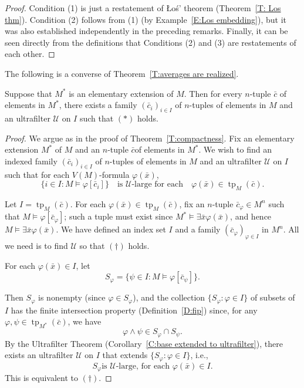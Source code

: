 \documentclass{scrartcl}
\DeclareMathOperator{\tp}{tp}
\renewcommand{\phi}{\varphi}
\newcommand{\SU}{\mathscr{U}}
\begin{document}
\begin{proof}
Condition (1) is just a restatement of Łoś' theorem (Theorem~\ref{T: Los thm}). Condition (2) follows from (1)  (by Example~\ref{E:Los embedding}), but it was also established independently in the preceding remarks.
Finally, it can be seen directly from the definitions that Conditions (2) and (3) are restatements of each other.
\end{proof}

The following is a converse of Theorem~\ref{T:averages are realized}.

\begin{theorem}
\label{T:elements are averages}
Suppose that $M^*$ is an elementary extension of $M$. Then for every $n$-tuple $\bar{c}$ of elements in $M^*$, there exists a family $(\bar{c}_i)_{i\in I}$ of $n$-tuples of elements in $M$ and an ultrafilter $\SU$ on $I$ such that $(*)$ holds.

\end{theorem}

\begin{proof}
We argue as in the proof of Theorem~\ref{T:compactness}. Fix an elementary extension $M^*$ of $M$ and an $n$-tuple $\bar c$of elements in $M^*$. We wish to find an indexed family $(\bar{c}_i)_{i\in I}$ of $n$-tuples of elements in $M$ and an ultrafilter $\mathscr{U}$ on $I$ such that for each $V(M)$-formula $\phi(\bar{x})$,
\[
\tag{$\dagger$}
\{i\in I\colon M\models \phi[\bar{c}_i]\}
\quad\text{is $\SU$-large for each}\quad
\phi(\bar{x}) \in \tp_{M}(\bar{c}).
\]

Let $I=\tp_{M}(\bar{c})$. For each $\phi(\bar x)\in \tp_{M}(\bar{c})$, fix an $n$-tuple $\bar{c}_\phi\in M^n$ such that $M\models\phi[\bar{c}_\phi]$; such a tuple must exist since $M^*\models \exists \bar{x} \phi(\bar x)$, and hence $M\models \exists \bar{x} \phi(\bar x)$. We have defined an index set $I$ and a family $(\bar{c}_\phi)_{\phi\in I}$ in $M^n$. All we need is to find $\SU$ so that $(\dagger)$ holds.

For each $\phi(\bar{x})\in I$, let
\[
S_\phi = 
\{ \psi\in I \colon M\models\phi[\bar{c}_\psi] \}.
\]

Then $S_\phi$ is nonempty (since $\phi \in S_\phi$), and
the collection $\{S_\phi \colon \phi \in I\}$ of subsets of $I$ has the finite intersection property (Definition~\ref{D:fip}) since, for any $\phi,\psi\in \tp_{M^*}(\bar{c})$, we have
\[
\phi\wedge\psi\in S_\phi\cap S_\psi.
\]
By the Ultrafilter Theorem (Corollary~\ref{C:base extended to ultrafilter}), there exists an ultrafilter $\SU$ on $I$ that extends $\{S_\phi \colon \phi \in I\}$, i.e.,
\[
\text{$S_\phi$
is $\mathscr{U}$-large, for each $\phi(\bar{x}) \in I$}.
\]
This is equivalent to $(\dagger)$.
\end{proof}
\end{document}
